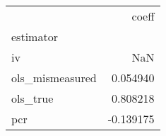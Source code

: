 \begin{tabular}{lr}
\toprule
{} &     coeff \\
estimator       &           \\
\midrule
iv              &       NaN \\
ols\_mismeasured &  0.054940 \\
ols\_true        &  0.808218 \\
pcr             & -0.139175 \\
\bottomrule
\end{tabular}
